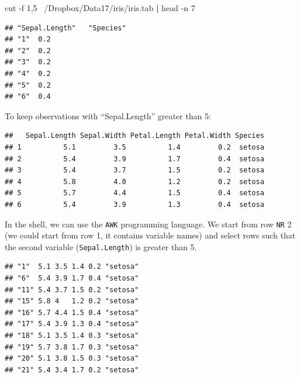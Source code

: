 \documentclass[]{book}
\newenvironment{Shaded}{\begin{snugshade}}{\end{snugshade}}
\newcommand{\KeywordTok}[1]{\textcolor[rgb]{0.13,0.29,0.53}{\textbf{#1}}}
\newcommand{\DecValTok}[1]{\textcolor[rgb]{0.00,0.00,0.81}{#1}}
\newcommand{\StringTok}[1]{\textcolor[rgb]{0.31,0.60,0.02}{#1}}
\newcommand{\FunctionTok}[1]{\textcolor[rgb]{0.00,0.00,0.00}{#1}}
\newcommand{\OperatorTok}[1]{\textcolor[rgb]{0.81,0.36,0.00}{\textbf{#1}}}
\newcommand{\NormalTok}[1]{#1}
\theoremstyle{definition}
\theoremstyle{definition}
\theoremstyle{definition}
\theoremstyle{remark}
\begin{document}
\begin{Shaded}
\begin{Highlighting}[]
\FunctionTok{cut}\NormalTok{ -f 1,5 ~/Dropbox/Data17/iris/iris.tab }\KeywordTok{|} \FunctionTok{head}\NormalTok{ -n 7}
\end{Highlighting}
\end{Shaded}

\begin{verbatim}
## "Sepal.Length"   "Species"
## "1"  0.2
## "2"  0.2
## "3"  0.2
## "4"  0.2
## "5"  0.2
## "6"  0.4
\end{verbatim}

To keep observations with ``Sepal.Length'' greater than 5:

\begin{Shaded}
\end{Shaded}

\begin{verbatim}
##   Sepal.Length Sepal.Width Petal.Length Petal.Width Species
## 1          5.1         3.5          1.4         0.2  setosa
## 2          5.4         3.9          1.7         0.4  setosa
## 3          5.4         3.7          1.5         0.2  setosa
## 4          5.8         4.0          1.2         0.2  setosa
## 5          5.7         4.4          1.5         0.4  setosa
## 6          5.4         3.9          1.3         0.4  setosa
\end{verbatim}

In the shell, we can use the \texttt{AWK} programming language. We start
from row \texttt{NR} 2 (we could start from row 1, it contains variable
names) and select rows such that the second variable
(\texttt{Sepal.Length}) is greater than 5.

\begin{Shaded}
\end{Shaded}

\begin{verbatim}
## "1"  5.1 3.5 1.4 0.2 "setosa"
## "6"  5.4 3.9 1.7 0.4 "setosa"
## "11" 5.4 3.7 1.5 0.2 "setosa"
## "15" 5.8 4   1.2 0.2 "setosa"
## "16" 5.7 4.4 1.5 0.4 "setosa"
## "17" 5.4 3.9 1.3 0.4 "setosa"
## "18" 5.1 3.5 1.4 0.3 "setosa"
## "19" 5.7 3.8 1.7 0.3 "setosa"
## "20" 5.1 3.8 1.5 0.3 "setosa"
## "21" 5.4 3.4 1.7 0.2 "setosa"
\end{verbatim}
\end{document}
